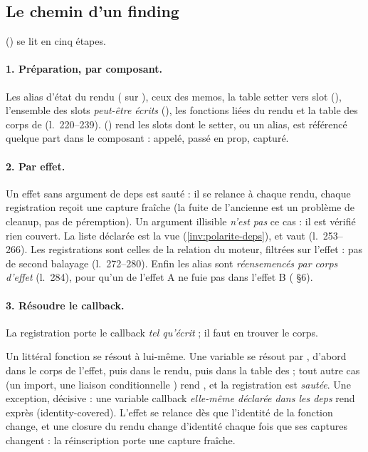 \subsection{Le chemin d'un finding}

 () se lit en cinq étapes.

\paragraph{1. Préparation, par composant.} Les alias d'état du rendu ( sur ), ceux des memos, la table setter vers slot (), l'ensemble des slots \emph{peut-être écrits} (), les fonctions liées du rendu et la table des corps de  (l.~220--239).  () rend les slots dont le setter, ou un alias, est référencé quelque part dans le composant : appelé, passé en prop, capturé.

\paragraph{2. Par effet.} Un effet sans argument de deps est sauté : il se relance à chaque rendu, chaque registration reçoit une capture fraîche (la fuite de l'ancienne est un problème de cleanup, pas de péremption). Un argument illisible \emph{n'est pas} ce cas : il est vérifié \og rien couvert\fg{}. La liste déclarée est la vue  (\cref{inv:polarite-deps}), et  vaut  (l.~253--266). Les registrations sont celles de la relation du moteur, filtrées sur l'effet : pas de second balayage (l.~272--280). Enfin les alias sont \emph{réensemencés par corps d'effet} (l.~284), pour qu'un  de l'effet A ne fuie pas dans l'effet B ( §6).

\paragraph{3. Résoudre le callback.} La registration porte le callback \emph{tel qu'écrit} ; il faut en trouver le corps.


Un littéral fonction se résout à lui-même. Une variable se résout par , d'abord dans le corps de l'effet, puis dans le rendu, puis dans la table des  ; tout autre cas (un import, une liaison conditionnelle ) rend , et la registration est \emph{sautée}. Une exception, décisive : une variable callback \emph{elle-même déclarée dans les deps} rend  exprès (\og identity-covered\fg{}). L'effet se relance dès que l'identité de la fonction change, et une closure du rendu change d'identité chaque fois que ses captures changent : la réinscription porte une capture fraîche.

